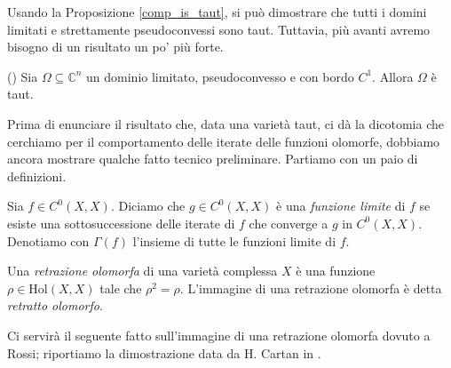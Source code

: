 Usando la Proposizione \ref{comp_is_taut}, si può dimostrare che tutti i domini limitati e strettamente pseudoconvessi sono taut. Tuttavia, più avanti avremo bisogno di un risultato un po' più forte.

\begin{prop} \label{psdcvx_is_taut}
    (\cite[Proposition 2]{KR}) Sia $\Omega\subseteq\mathbb{C}^n$ un dominio limitato, pseudoconvesso e con bordo $C^1$. Allora $\Omega$ è taut.
\end{prop}

Prima di enunciare il risultato che, data una varietà taut, ci dà la dicotomia che cerchiamo per il comportamento delle iterate delle funzioni olomorfe, dobbiamo ancora mostrare qualche fatto tecnico preliminare. Partiamo con un paio di definizioni.

\begin{defn}
    Sia $f\in C^0(X,X)$. Diciamo che $g\in C^0(X,X)$ è una \textit{funzione limite} di $f$ se esiste una sottosuccessione delle iterate di $f$ che converge a $g$ in $C^0(X,X)$. Denotiamo con $\Gamma(f)$ l'insieme di tutte le funzioni limite di $f$.
\end{defn}

\begin{defn}
    Una \textit{retrazione olomorfa} di una varietà complessa $X$ è una funzione $\rho\in\text{Hol}(X,X)$ tale che $\rho^2=\rho$. L'immagine di una retrazione olomorfa è detta \textit{retratto olomorfo}.
\end{defn}

Ci servirà il seguente fatto sull'immagine di una retrazione olomorfa dovuto a Rossi; riportiamo la dimostrazione data da H. Cartan in \cite{Ca}.

